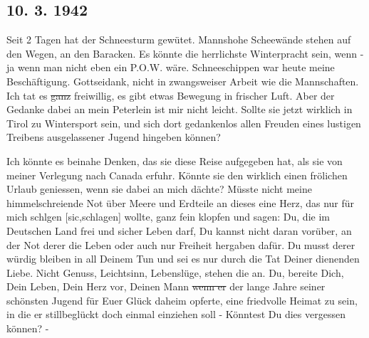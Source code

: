\subsection{10. 3. 1942}

Seit 2 Tagen hat der Schneesturm gew\"{u}tet.
Mannshohe Scheew\"{a}nde stehen auf den Wegen, an den Baracken.
Es k\"{o}nnte die herrlichste Winterpracht sein, wenn - ja wenn man nicht eben ein P.O.W. w\"{a}re.
Schneeschippen war heute meine Besch\"{a}ftigung.
Gottseidank, nicht in zwangsweiser Arbeit wie die Mannschaften.
Ich tat es \st{ganz} freiwillig, es gibt etwas Bewegung in frischer Luft.
Aber der Gedanke dabei an mein Peterlein ist mir nicht leicht.
Sollte sie jetzt wirklich in Tirol zu Wintersport sein, und sich dort gedankenlos allen Freuden eines lustigen Treibens ausgelassener Jugend hingeben k\"{o}nnen?

Ich k\"{o}nnte es beinahe Denken, das sie diese Reise aufgegeben hat, als sie von meiner Verlegung nach Canada erfuhr.
K\"{o}nnte sie den wirklich einen fr\"{o}lichen Urlaub geniessen, wenn sie dabei an mich d\"{a}chte?
M\"{u}sste nicht meine himmelschreiende Not \"{u}ber Meere und Erdteile an dieses eine Herz, das nur f\"{u}r mich schlgen {\color{red} [sic,schlagen] } wollte, ganz fein klopfen und sagen: Du, die im Deutschen Land frei und sicher Leben darf, Du kannst nicht daran vor\"{u}ber, an der Not derer die Leben oder auch nur Freiheit hergaben daf\"{u}r.
Du musst derer w\"{u}rdig bleiben in all Deinem Tun und sei es nur durch die Tat Deiner dienenden Liebe.
Nicht Genuss, Leichtsinn, Lebensl\"{u}ge, stehen die an.
Du, bereite Dich, Dein Leben, Dein Herz vor, Deinen Mann \st{wenn er} der lange Jahre seiner sch\"{o}nsten Jugend f\"{u}r Euer Gl\"{u}ck daheim opferte, eine friedvolle Heimat zu sein, in die er stillbegl\"{u}ckt doch einmal einziehen soll
- K\"{o}nntest Du dies vergessen k\"{o}nnen? -

\clearpage
